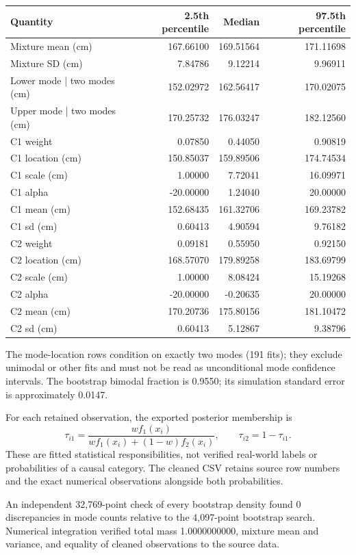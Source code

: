 \documentclass[11pt,a4paper]{article}
\begin{document}
\begin{center}
\small
\begin{tabular}{lrrr}
\toprule
Quantity & 2.5th percentile & Median & 97.5th percentile\\
\midrule
Mixture mean (cm) & 167.66100 & 169.51564 & 171.11698\\
Mixture SD (cm) & 7.84786 & 9.12214 & 9.96911\\
Lower mode | two modes (cm) & 152.02972 & 162.56417 & 170.02075\\
Upper mode | two modes (cm) & 170.25732 & 176.03247 & 182.12560\\
C1 weight & 0.07850 & 0.44050 & 0.90819\\
C1 location (cm) & 150.85037 & 159.89506 & 174.74534\\
C1 scale (cm) & 1.00000 & 7.72041 & 16.09971\\
C1 alpha & -20.00000 & 1.24040 & 20.00000\\
C1 mean (cm) & 152.68435 & 161.32706 & 169.23782\\
C1 sd (cm) & 0.60413 & 4.90594 & 9.76182\\
C2 weight & 0.09181 & 0.55950 & 0.92150\\
C2 location (cm) & 168.57070 & 179.89258 & 183.69799\\
C2 scale (cm) & 1.00000 & 8.08424 & 15.19268\\
C2 alpha & -20.00000 & -0.20635 & 20.00000\\
C2 mean (cm) & 170.20736 & 175.80156 & 181.10472\\
C2 sd (cm) & 0.60413 & 5.12867 & 9.38796\\
\bottomrule
\end{tabular}
\end{center}
The mode-location rows condition on exactly two modes (191 fits); they exclude unimodal or other fits and must not be read as unconditional mode confidence intervals. The bootstrap bimodal fraction is 0.9550; its simulation standard error is approximately 0.0147.

For each retained observation, the exported posterior membership is
\[
 \tau_{i1}=\frac{wf_1(x_i)}{wf_1(x_i)+(1-w)f_2(x_i)},\qquad
 \tau_{i2}=1-\tau_{i1}.
\]
These are fitted statistical responsibilities, not verified real-world labels
or probabilities of a causal category. The cleaned CSV retains source row
numbers and the exact numerical observations alongside both probabilities.

An independent 32,769-point check of every bootstrap density found 0 discrepancies in mode counts relative to the 4,097-point bootstrap search. Numerical integration verified total mass 1.0000000000, mixture mean and variance, and equality of cleaned observations to the source data.
\end{document}
